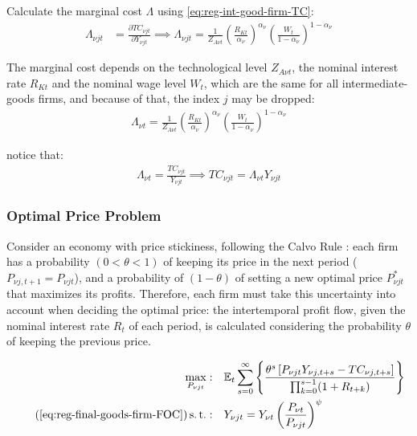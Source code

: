 \documentclass[
thesis.tex
]{subfiles}
\begin{document}

Calculate the marginal cost $\Lambda$ using \ref{eq:reg-int-good-firm-TC}: 
\begin{align}
	\Lambda_{\nu jt} & = \frac{\partial TC_{\nu jt}}{\partial Y_{\nu jt}} \implies 
	\Lambda_{\nu jt} = \frac{1}{Z_{A\nu t}} \left( \frac{R_{Kt}}{{\alpha_\nu}} \right)^{{\alpha_\nu}} \left( \frac{W_t}{1-{\alpha_\nu}} \right)^{1-{\alpha_\nu}} \label{eq:reg-int-good-firm-MC}
\end{align}

The marginal cost depends on the technological level $Z_{A\nu t}$, the nominal interest rate $R_{Kt}$ and the nominal wage level $W_t$, which are the same for all intermediate-goods firms, and because of that, the index $j$ may be dropped:
\begin{align}
	\label{eq:reg-int-good-firm-MC-2}
	\Lambda_{\nu t} = \frac{1}{Z_{A\nu t}} \left( \frac{R_{Kt}}{{\alpha_\nu}} \right)^{{\alpha_\nu}} \left( \frac{W_t}{1-{\alpha_\nu}} \right)^{1-{\alpha_\nu}}
\end{align}

notice that:
\begin{align}
	\label{eq:reg-int-good-firm-TC-MC}
	\Lambda_{\nu t} = \frac{TC_{\nu jt}}{Y_{\nu jt}} \implies 
	TC_{\nu jt} = \Lambda_{\nu t} Y_{\nu jt}
\end{align}


\subsubsection*{Optimal Price Problem}

Consider an economy with price stickiness, following the Calvo Rule \cite{calvo_staggered_1983}: each firm has a probability $(0 < \theta < 1)$ of keeping its price in the next period ($P_{\nu j,t+1} = P_{\nu jt}$), and a probability of $(1 - \theta)$ of setting a new optimal price $P_{\nu jt}^\ast$ that maximizes its profits. Therefore, each firm must take this uncertainty into account when deciding the optimal price: the intertemporal profit flow, given the nominal interest rate $R_{t}$ of each period, is calculated considering the probability $\theta$ of keeping the previous price.

\begin{align}
	\label{eq:reg-int-good-firm-optimal-price-problem}
	\max_{P_{\nu jt}}: & \quad \E \sum_{s=0}^{\infty} \left\{ \frac{ \theta^s \left[ P_{\nu jt} Y_{\nu j,t+s} - TC_{\nu j,t+s} \right] }{\prod_{k=0}^{s-1}(1+R_{t+k})} \right\} \\
	\tag{\ref{eq:reg-final-goods-firm-FOC}}
	\st: & \quad Y_{\nu jt} = Y_{\nu t} \left( \frac{P_{\nu t}}{P_{\nu jt}} \right)^{\psi}
\end{align}
\end{document}
